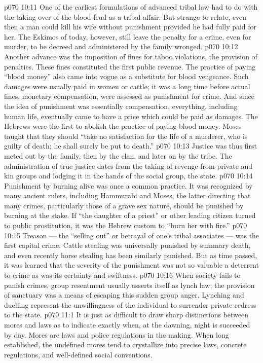 \vs p070 10:11 One of the earliest formulations of advanced tribal law had to do with the taking over of the blood feud as a tribal affair. But strange to relate, even then a man could kill his wife without punishment provided he had fully paid for her. The Eskimos of today, however, still leave the penalty for a crime, even for murder, to be decreed and administered by the family wronged.
\vs p070 10:12 Another advance was the imposition of fines for taboo violations, the provision of penalties. These fines constituted the first public revenue. The practice of paying “blood money” also came into vogue as a substitute for blood vengeance. Such damages were usually paid in women or cattle; it was a long time before actual fines, monetary compensation, were assessed as punishment for crime. And since the idea of punishment was essentially compensation, everything, including human life, eventually came to have a price which could be paid as damages. The Hebrews were the first to abolish the practice of paying blood money. Moses taught that they should “take no satisfaction for the life of a murderer, who is guilty of death; he shall surely be put to death.”
\vs p070 10:13 \pc Justice was thus first meted out by the family, then by the clan, and later on by the tribe. The administration of true justice dates from the taking of revenge from private and kin groups and lodging it in the hands of the social group, the state.
\vs p070 10:14 \pc Punishment by burning alive was once a common practice. It was recognized by many ancient rulers, including Hammurabi and Moses, the latter directing that many crimes, particularly those of a grave sex nature, should be punished by burning at the stake. If “the daughter of a priest” or other leading citizen turned to public prostitution, it was the Hebrew custom to “burn her with fire.”
\vs p070 10:15 Treason --- the “selling out” or betrayal of one’s tribal associates --- was the first capital crime. Cattle stealing was universally punished by summary death, and even recently horse stealing has been similarly punished. But as time passed, it was learned that the severity of the punishment was not so valuable a deterrent to crime as was its certainty and swiftness.
\vs p070 10:16 When society fails to punish crimes, group resentment usually asserts itself as lynch law; the provision of sanctuary was a means of escaping this sudden group anger. Lynching and duelling represent the unwillingness of the individual to surrender private redress to the state.
\vs p070 11:1 It is just as difficult to draw sharp distinctions between mores and laws as to indicate exactly when, at the dawning, night is succeeded by day. Mores are laws and police regulations in the making. When long established, the undefined mores tend to crystallize into precise laws, concrete regulations, and well\hyp{}defined social conventions.
